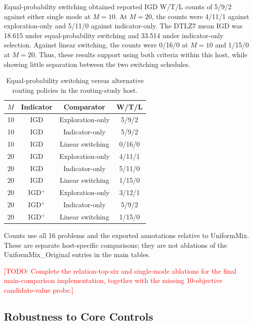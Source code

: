 \documentclass[final,5p,times,twocolumn]{elsarticle}
\newcommand{\TODO}[1]{\textcolor{red}{[TODO: #1]}}
\begin{document}
Equal-probability switching obtained reported IGD W/T/L counts of
5/9/2 against either single mode at $M=10$. At $M=20$, the counts were
4/11/1 against exploration-only and 5/11/0 against indicator-only.
The DTLZ7 mean IGD was 18.615 under equal-probability switching and
33.514 under indicator-only selection. Against linear switching, the
counts were 0/16/0 at $M=10$ and 1/15/0 at $M=20$. Thus, these results
support using both criteria within this host, while showing little
separation between the two switching schedules.

\begin{table}[t]
\centering
\caption{Equal-probability switching versus alternative routing policies in the routing-study host.}
\label{tab:exp:routing}
\scriptsize
\setlength{\tabcolsep}{3pt}
\renewcommand{\arraystretch}{1.12}
\begin{tabular}{lccc}
\toprule
$M$ & Indicator & Comparator & W/T/L \\
\midrule
10 & IGD & Exploration-only & 5/9/2 \\
10 & IGD & Indicator-only & 5/9/2 \\
10 & IGD & Linear switching & 0/16/0 \\
\midrule
20 & IGD & Exploration-only & 4/11/1 \\
20 & IGD & Indicator-only & 5/11/0 \\
20 & IGD & Linear switching & 1/15/0 \\
\midrule
20 & IGD$^+$ & Exploration-only & 3/12/1 \\
20 & IGD$^+$ & Indicator-only & 5/9/2 \\
20 & IGD$^+$ & Linear switching & 1/15/0 \\
\bottomrule
\end{tabular}
\par\smallskip
\begin{minipage}{\linewidth}
\scriptsize Counts use all 16 problems and the exported annotations relative to UniformMix. These are separate host-specific comparisons; they are not ablations of the UniformMix\_Original entries in the main tables.
\end{minipage}
\end{table}

\TODO{Complete the relation-top-six and single-mode ablations for the
final main-comparison implementation, together with the missing
10-objective candidate-value probe.}

\subsection{Robustness to Core Controls}
\label{sec:exp:sensitivity}
\end{document}
